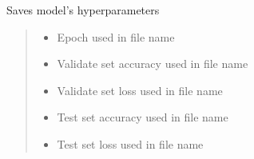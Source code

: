 \documentclass[letterpaper,10pt,english]{sphinxmanual}
\begin{document}
\begin{fulllineitems}
\begin{fulllineitems}
\label{\detokenize{net:net.UVANEMO.__save_model}}
\pysigstartsignatures
{}
\pysigstopsignatures
\sphinxAtStartPar
Saves model’s hyperparameters
\begin{quote}\begin{description}
\begin{itemize}
\item {} 
\sphinxAtStartPar
{} \textendash{} Epoch used in file name

\item {} 
\sphinxAtStartPar
{} \textendash{} Validate set accuracy used in file name

\item {} 
\sphinxAtStartPar
{} \textendash{} Validate set loss used in file name

\item {} 
\sphinxAtStartPar
{} \textendash{} Test set accuracy used in file name

\item {} 
\sphinxAtStartPar
{} \textendash{} Test set loss used in file name

\end{itemize}

\end{description}\end{quote}

\end{fulllineitems}



\end{fulllineitems}
\end{document}
